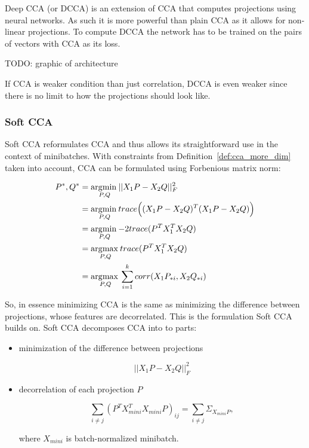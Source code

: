 Deep CCA (or DCCA) is an extension of CCA that computes projections using
neural networks. As such it is more powerful than plain CCA as it allows for
non-linear projections. To compute DCCA the network has to be trained on the
pairs of vectors with CCA as its loss.

TODO: graphic of architecture

If CCA is weaker condition than just correlation, DCCA is even weaker since
there is no limit to how the projections should look like.

\subsubsection{Soft CCA}

Soft CCA reformulates CCA and thus allows its straightforward use in the
context of minibatches. With constraints from Definition~\ref{def:cca_more_dim}
taken into account, CCA can be formulated using Forbenious matrix norm:

\begin{align}
  P^\ast, Q^\ast &= \underset{P, Q}{\operatorname*{\arg\!\min\medspace}} ||X_1P - X_2Q||^2_F \\
  &= \underset{P, Q}{\operatorname*{\arg\!\min\medspace}} trace\Big((X_1P - X_2Q)^T(X_1P - X_2Q)\Big) \\
  &= \underset{P, Q}{\operatorname*{\arg\!\min\medspace}} {-2} trace(P^TX_1^TX_2Q) \\
  &= \underset{P, Q}{\operatorname*{\arg\!\max\medspace}} trace(P^TX_1^TX_2Q) \\
  &= \underset{P, Q}{\operatorname*{\arg\!\max\medspace}} \sum_{i = 1}^k corr(X_1P_{*i}, X_2Q_{*i})
\end{align}

So, in essence minimizing CCA is the same as minimizing the difference between
projections, whose features are decorrelated. This is the formulation Soft CCA
builds on. Soft CCA decomposes CCA into to parts:

\begin{itemize}
  \item minimization of the difference between projections

    \begin{equation}
      ||X_1P - X_2Q||^2_F
    \end{equation}

  \item decorrelation of each projection $P$

    \begin{equation}
      \sum_{i \ne j} (P^TX^T_{mini}X_{mini}P)_{ij} = \sum_{i \ne j} \Sigma_{X_{mini}P},
    \end{equation}

    where $X_{mini}$ is batch-normalized minibatch.

\end{itemize}

